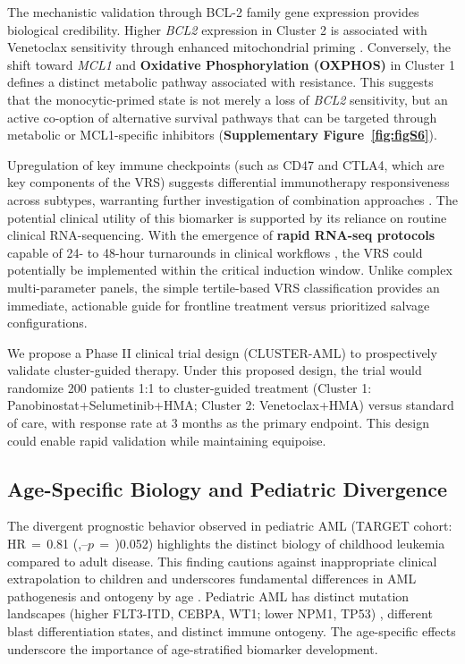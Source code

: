\documentclass[11pt,a4paper]{article}
\newcommand{\pval}[1]{$p$\,$=$\,#1}
\newcommand{\hr}[3]{HR\,$=$\,#1 (#2--#3)}
\begin{document}
The mechanistic validation through BCL-2 family gene expression provides biological credibility. Higher \textit{BCL2} expression in Cluster 2 is associated with Venetoclax sensitivity through enhanced mitochondrial priming \cite{pan2014bcl2,lagadinou2013bcl2}. Conversely, the shift toward \textit{MCL1} and \textbf{Oxidative Phosphorylation (OXPHOS)} in Cluster 1 defines a distinct metabolic pathway associated with resistance. This suggests that the monocytic-primed state is not merely a loss of \textit{BCL2} sensitivity, but an active co-option of alternative survival pathways that can be targeted through metabolic or MCL1-specific inhibitors (\textbf{Supplementary Figure~\ref{fig:figS6}}).

Upregulation of key immune checkpoints (such as CD47 and CTLA4, which are key components of the VRS) suggests differential immunotherapy responsiveness across subtypes, warranting further investigation of combination approaches \cite{daver2019targeting}. The potential clinical utility of this biomarker is supported by its reliance on routine clinical RNA-sequencing. With the emergence of \textbf{rapid RNA-seq protocols} capable of 24- to 48-hour turnarounds in clinical workflows \cite{dohner2017eln}, the VRS could potentially be implemented within the critical induction window. Unlike complex multi-parameter panels, the simple tertile-based VRS classification provides an immediate, actionable guide for frontline treatment versus prioritized salvage configurations.

We propose a Phase II clinical trial design (CLUSTER-AML) to prospectively validate cluster-guided therapy. Under this proposed design, the trial would randomize 200 patients 1:1 to cluster-guided treatment (Cluster 1: Panobinostat+Selumetinib+HMA; Cluster 2: Venetoclax+HMA) versus standard of care, with response rate at 3 months as the primary endpoint. This design could enable rapid validation while maintaining equipoise.

\subsection{Age-Specific Biology and Pediatric Divergence}

The divergent prognostic behavior observed in pediatric AML (TARGET cohort: \hr{0.81}, \pval{0.052}) highlights the distinct biology of childhood leukemia compared to adult disease. This finding cautions against inappropriate clinical extrapolation to children and underscores fundamental differences in AML pathogenesis and ontogeny by age \cite{bolouri2018target}. Pediatric AML has distinct mutation landscapes (higher FLT3-ITD, CEBPA, WT1; lower NPM1, TP53) \cite{bolouri2018target}, different blast differentiation states, and distinct immune ontogeny. The age-specific effects underscore the importance of age-stratified biomarker development.
\end{document}
